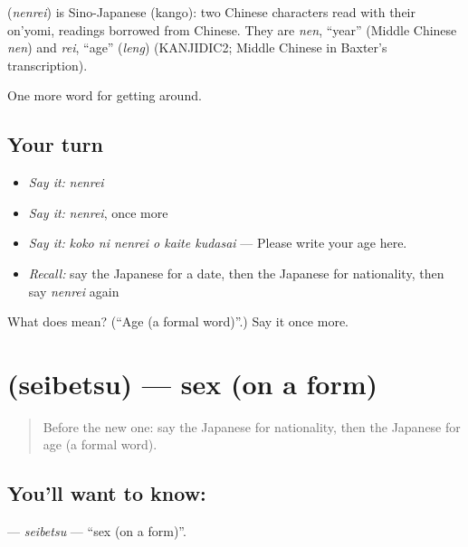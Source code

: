 \begin{cousinweb}
\textbf{} (\emph{nenrei}) is Sino-Japanese (kango): two Chinese characters read with their on'yomi, readings borrowed from Chinese. They are \emph{nen}, \textquotedblleft{}year\textquotedblright{} (Middle Chinese \emph{nen}) and \emph{rei}, \textquotedblleft{}age\textquotedblright{} (\emph{leng}) (KANJIDIC2; Middle Chinese in Baxter's transcription).
\end{cousinweb}

\begin{grammarlens}[title={What you've built}]
One more word for getting around.
\end{grammarlens}

\subsection*{Your turn}
\begin{itemize}
\raggedright
  \item \emph{Say it:} \emph{nenrei}
  \item \emph{Say it:} \emph{nenrei}, once more
  \item \emph{Say it:} \emph{koko ni nenrei o kaite kudasai} — Please write your age here.
  \item \emph{Recall:} say the Japanese for a date, then the Japanese for nationality, then say \emph{nenrei} again
\end{itemize}

\begin{tcolorbox}[breakable,colback=teal!4,colframe=teal!35!black,title={Before you move on}]
What does  mean? (\textquotedblleft{}Age (a formal word)\textquotedblright{}.) Say it once more.
\end{tcolorbox}
\section[\texorpdfstring{\ja{せいべつ} (seibetsu)}{せいべつ (seibetsu)}]{ (seibetsu) — sex (on a form)}

\label{lesson:JA-C419-seibetsu}



\begin{quote}
Before the new one: say the Japanese for nationality, then the Japanese for age (a formal word).
\end{quote}

\subsection*{You'll want to know: }
\textbf{} — \emph{seibetsu} — \textquotedblleft{}sex (on a form)\textquotedblright{}.

